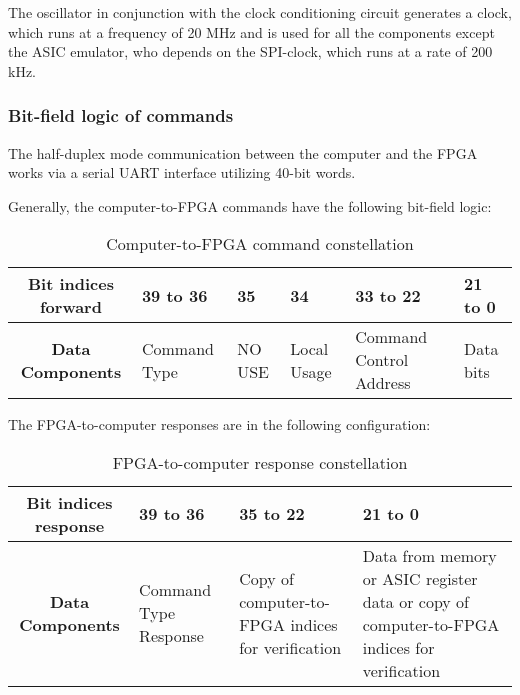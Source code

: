 The oscillator in conjunction with the clock conditioning circuit generates a clock, which runs at a frequency of 20 MHz and is used for all the components except the ASIC emulator, who depends on the SPI-clock, which runs at a rate of 200 kHz.

\subsubsection{Bit-field logic of commands}
The half-duplex mode communication between the computer and the FPGA works via a serial UART interface utilizing 40-bit words.
\newline

Generally, the computer-to-FPGA commands have the following bit-field logic:

\begin{table}[H]

    \label{tab:4}
    
  \begin{center}  
  \begin{tabular}{|c|p{2cm}|p{2cm}|p{2.5cm}|p{2cm}|p{2cm}|}
  \hline
  \textbf{Bit indices forward}  & 39 to 36  & 35 & 34 & 33 to 22 & 21 to 0\\ 
  \hline
  \textbf{Data Components} & Command \newline Type & NO USE & Local Usage & Command Control Address & Data bits \\
  \hline
  
\end{tabular}
\end{center}
\caption[]{Computer-to-FPGA command constellation}
\end{table}

The FPGA-to-computer responses are in the following configuration:


\begin{table}[H]

    \label{tab:5}
    
  \begin{center}  
  \begin{tabular}{|c|p{3cm}|p{3cm}|p{3cm}|}
  \hline
  \textbf{Bit indices response}  & 39 to 36  & 35 to 22 & 21 to 0 \\ 
  \hline
  \textbf{Data Components} & Command Type Response & Copy of computer-to-FPGA indices for verification & Data from memory or ASIC register data or copy of computer-to-FPGA indices for verification \\
  \hline
  
\end{tabular}
\end{center}
\caption[]{FPGA-to-computer response constellation}
\end{table}

